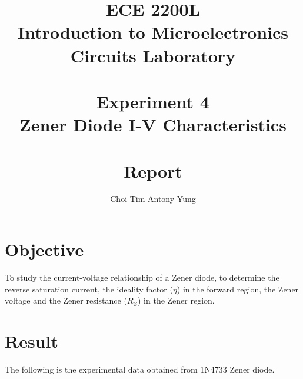 \documentclass{article}
\title{ECE 2200L\\Introduction to Microelectronics Circuits Laboratory\\\,\\Experiment 4\\Zener Diode I-V Characteristics\\\,\\Report}
\author{Choi Tim Antony Yung}
\begin{document}
\maketitle

\thispagestyle{empty}
\setcounter{page}{0}

\newpage

\section*{Objective}

To study the current-voltage relationship of a Zener diode, to determine the reverse saturation current, the ideality factor ($\eta$) in the forward region, the Zener voltage and the Zener resistance ($R_Z$) in the Zener region.

\section*{Result}
The following is the experimental data obtained from 1N4733 Zener diode.
\end{document}
